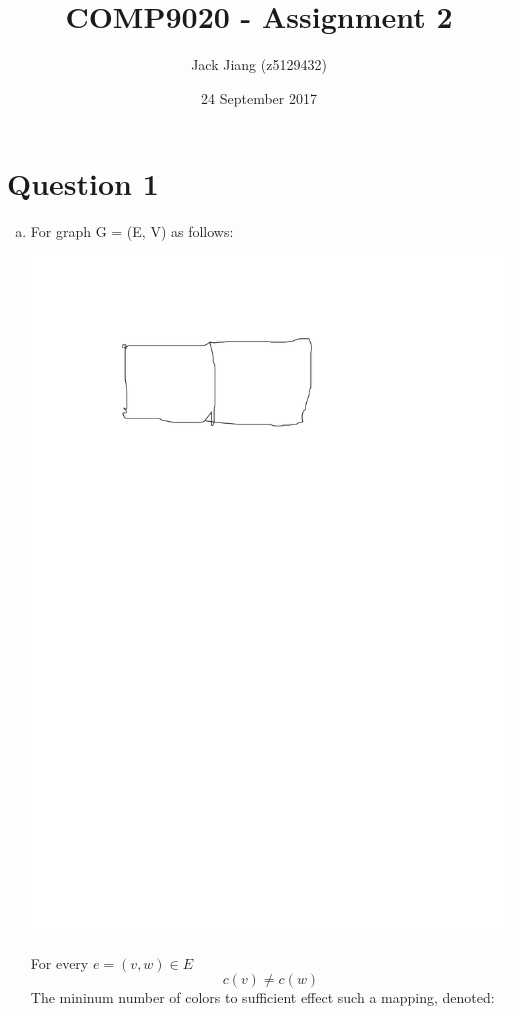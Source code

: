 \documentclass[11pt, a4paper]{article}
\begin{document}
\title{COMP9020 - Assignment 2}
\author{Jack Jiang (z5129432)}
\date{ 24 September 2017 }
\maketitle
\graphicspath{{Graphics/}}

\section*{Question 1}
\begin{enumerate}[(a)]
    \item
    For graph G = (E, V) as follows:
    \begin{center}
        \includegraphics{q1a1}
    \end{center}
    For every $e = (v, w) \in E$
    $$ c(v) \ne c(w) $$
    The mininum number of colors to sufficient effect such a mapping, denoted:

\end{enumerate}
\end{document}
